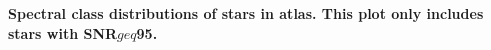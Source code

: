 {\bf  Spectral class distributions of stars in atlas. This plot only includes stars with SNR$geq$95.\label{fig:hiso-spt-type}}